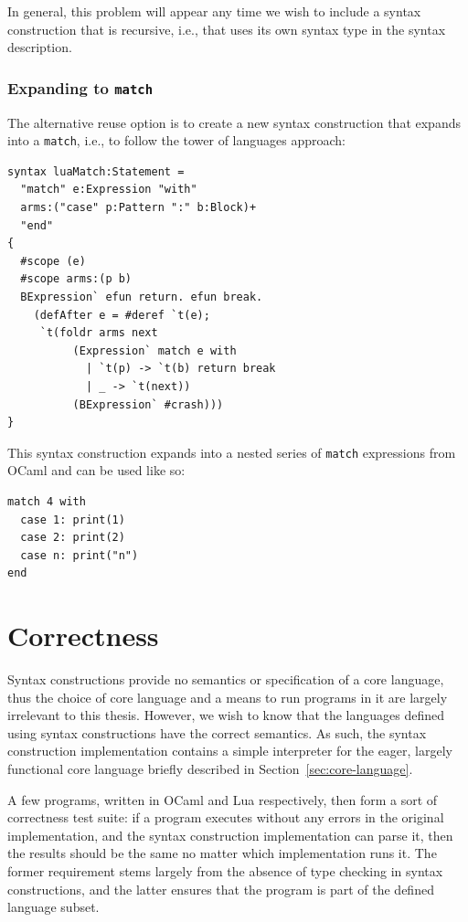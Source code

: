 \documentclass{kththesis}
\begin{document}
In general, this problem will appear any time we wish to include a syntax construction that is recursive, i.e., that uses its own syntax type in the syntax description. %

\subsubsection{Expanding to \texttt{match}}

The alternative reuse option is to create a new syntax construction that expands into a \texttt{match}, i.e., to follow the tower of languages approach:

\begin{verbatim}
syntax luaMatch:Statement =
  "match" e:Expression "with"
  arms:("case" p:Pattern ":" b:Block)+
  "end"
{
  #scope (e)
  #scope arms:(p b)
  BExpression` efun return. efun break.
    (defAfter e = #deref `t(e);
     `t(foldr arms next
          (Expression` match e with
            | `t(p) -> `t(b) return break
            | _ -> `t(next))
          (BExpression` #crash)))
}
\end{verbatim}

This syntax construction expands into a nested series of \texttt{match} expressions from OCaml and can be used like so:

\begin{verbatim}
match 4 with
  case 1: print(1)
  case 2: print(2)
  case n: print("n")
end
\end{verbatim}

\section{Correctness} \label{sec:correctness-and-performance}

Syntax constructions provide no semantics or specification of a core language, thus the choice of core language and a means to run programs in it are largely irrelevant to this thesis. However, we wish to know that the languages defined using syntax constructions have the correct semantics. As such, the syntax construction implementation contains a simple interpreter for the eager, largely functional core language briefly described in Section~\ref{sec:core-language}.

A few programs, written in OCaml and Lua respectively, then form a sort of correctness test suite: if a program executes without any errors in the original implementation, and the syntax construction implementation can parse it, then the results should be the same no matter which implementation runs it. The former requirement stems largely from the absence of type checking in syntax constructions, and the latter ensures that the program is part of the defined language subset.
\end{document}

